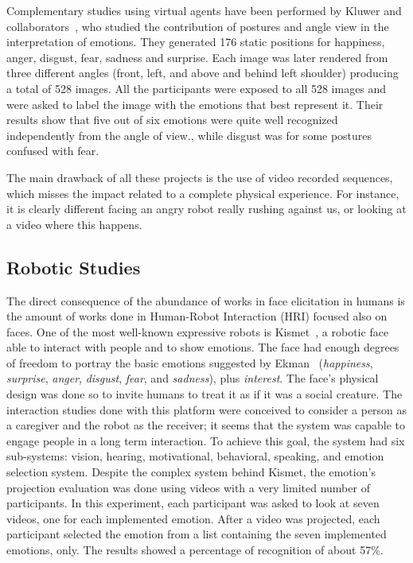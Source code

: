 Complementary studies using virtual agents have been performed by  Kluwer and collaborators~\cite{Kluwer2004}, who studied the contribution of postures and angle view in the interpretation of emotions. They generated 176 static positions for happiness, anger, disgust, fear, sadness and surprise. Each image was later rendered from three different angles (front, left, and above and behind left shoulder) producing a total of 528 images. All the participants were exposed to all 528 images and were asked to label the image with the emotions that best represent it. Their results show that five out of six emotions were quite well recognized independently from the angle of view., while disgust was for some postures confused with fear.

The main drawback of all these projects is the use of video recorded sequences, which misses the impact related to a complete physical experience. For instance, it is clearly different facing an angry robot really rushing against us, or looking at a video where this happens.

\subsection{Robotic Studies}

The direct consequence of the abundance of works in face elicitation in humans is the amount of works done in Human-Robot Interaction (HRI) focused also on faces. One of the most well-known expressive robots is Kismet~\cite{Breazeal2002}, a robotic face able to interact with people and to show emotions. The face had enough degrees of freedom to portray the basic emotions suggested by Ekman~\cite{Ekman2004} (\textit{happiness}, \textit{surprise}, \textit{anger}, \textit{disgust}, \textit{fear}, and \textit{sadness}), plus \textit{interest}. %
The face's physical design was done so to invite humans to treat it as if it was a social creature. The interaction studies done with this platform were conceived to consider a person as a caregiver and the robot as the receiver; it seems that the system was capable to engage people in a long term interaction. To achieve this goal, the system had six sub-systems: vision, hearing, motivational, behavioral, speaking, and emotion selection system. Despite the complex system behind Kismet, the emotion's projection evaluation was done using videos with a very limited number of participants. In this experiment, each participant was asked to look at seven videos, one for each implemented emotion. After a video was projected, each participant selected the emotion from a list containing  the seven implemented emotions, only. The results showed a percentage of recognition of about 57\%.


